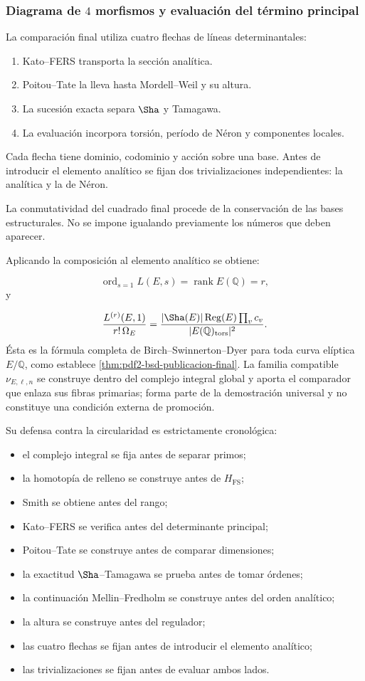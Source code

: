\subsubsection{Diagrama de \(4\) morfismos y evaluación del término principal}
La comparación final utiliza cuatro flechas de líneas determinantales:\par
\begin{enumerate}
\item Kato–FERS transporta la sección analítica.
\item Poitou–Tate la lleva hasta Mordell–Weil y su altura.
\item La sucesión exacta separa \(\Sha\) y Tamagawa.
\item La evaluación incorpora torsión, período de Néron y componentes locales.
\end{enumerate}
Cada flecha tiene dominio, codominio y acción sobre una base. Antes de introducir el elemento analítico se fijan dos trivializaciones independientes: la analítica y la de Néron.\par
La conmutatividad del cuadrado final procede de la conservación de las bases estructurales. No se impone igualando previamente los números que deben aparecer.\par
Aplicando la composición al elemento analítico se obtiene:\par
\[
\operatorname{ord}_{s=1}L(E,s)
=
\operatorname{rank}E(\mathbb Q)
=
r,
\]
y\par
\[
\frac{L^{(r)}(E,1)}
{r!\,\Omega_E}
=
\frac{
|\Sha(E)|
\operatorname{Reg}(E)
\prod_v c_v
}{
|E(\mathbb Q)_{\mathrm{tors}}|^2
}.
\]
Ésta es la fórmula completa de Birch--Swinnerton--Dyer para toda curva
elíptica \(E/\mathbb Q\), como establece
\cref{thm:pdf2-bsd-publicacion-final}. La familia compatible
\(\nu_{E,\ell,n}\) se construye dentro del complejo integral global y aporta
el comparador que enlaza sus fibras primarias; forma parte de la demostración
universal y no constituye una condición externa de promoción.\par
Su defensa contra la circularidad es estrictamente cronológica:\par
\begin{itemize}
\item el complejo integral se fija antes de separar primos;
\item la homotopía de relleno se construye antes de \(H_{\mathrm{FS}}\);
\item Smith se obtiene antes del rango;
\item Kato–FERS se verifica antes del determinante principal;
\item Poitou–Tate se construye antes de comparar dimensiones;
\item la exactitud \(\Sha\)–Tamagawa se prueba antes de tomar órdenes;
\item la continuación Mellin–Fredholm se construye antes del orden analítico;
\item la altura se construye antes del regulador;
\item las cuatro flechas se fijan antes de introducir el elemento analítico;
\item las trivializaciones se fijan antes de evaluar ambos lados.
\end{itemize}
